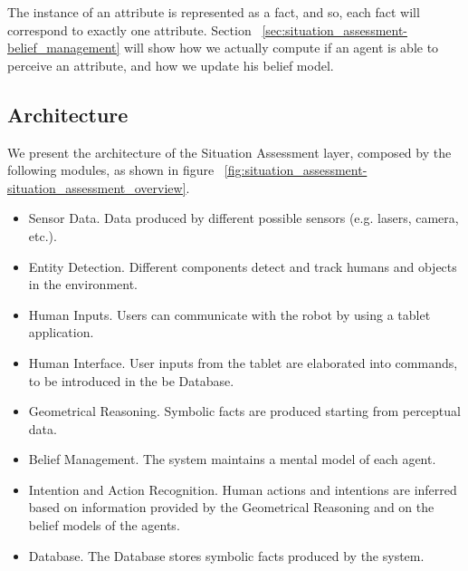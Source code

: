 The instance of an attribute is represented as a fact, and so, each fact will correspond to exactly one attribute. Section ~\ref{sec:situation_assessment-belief_management} will show how we actually compute if an agent is able to perceive an attribute, and how we update his belief model. 

\subsection{Architecture}

We present the architecture of the Situation Assessment layer, composed by the following modules, as shown in figure ~\ref{fig:situation_assessment-situation_assessment_overview}.

\begin{itemize}
\item Sensor Data. Data produced by different possible sensors (e.g. lasers, camera, etc.).
\item Entity Detection. Different components detect and track humans and objects in the environment.
\item Human Inputs. Users can communicate with the robot by using a tablet application.
\item Human Interface. User inputs from the tablet are elaborated into commands, to be introduced in the be Database.
\item Geometrical Reasoning. Symbolic facts are produced starting from perceptual data.
\item Belief Management. The system maintains a mental model of each agent.
\item Intention and Action Recognition. Human actions and intentions are inferred based on information provided by the Geometrical Reasoning and on the belief models of the agents.
\item Database. The Database stores symbolic facts produced by the system.
\end{itemize}


